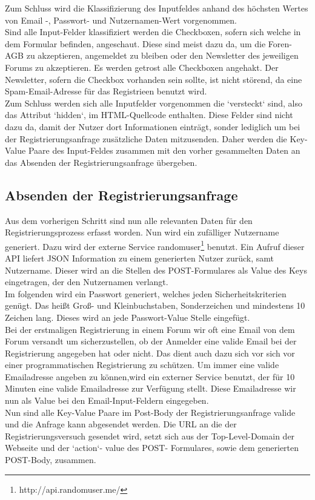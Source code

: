 Zum Schluss wird die Klassifizierung des Inputfeldes anhand des höchsten Wertes von Email -, Passwort- und Nutzernamen-Wert vorgenommen. \\
Sind alle Input-Felder klassifiziert werden die Checkboxen, sofern sich welche in dem Formular befinden, angeschaut. Diese sind meist dazu da, um die Foren-AGB zu akzeptieren, angemeldet zu bleiben oder den Newsletter des jeweiligen Forums zu akzeptieren.
Es werden getrost alle Checkboxen angehakt. Der Newsletter, sofern die Checkbox vorhanden sein sollte, ist nicht störend, da eine Spam-Email-Adresse für das Registrieen benutzt wird.\\
Zum Schluss werden sich alle Inputfelder vorgenommen die `versteckt` sind, also das Attribut `hidden`, im HTML-Quellcode enthalten.
Diese Felder sind nicht dazu da, damit der Nutzer dort Informationen einträgt, sonder lediglich um bei der Registrierungsanfrage zusätzliche Daten mitzusenden. Daher werden die Key-Value Paare des Input-Feldes zusammen mit den vorher gesammelten Daten an das Absenden der Registrierungsanfrage übergeben.
\subsection{Absenden der Registrierungsanfrage}
Aus dem vorherigen Schritt sind nun alle relevanten Daten für den Registrierungsprozess erfasst worden. Nun wird ein zufälliger Nutzername generiert. Dazu wird der externe Service randomuser\footnote{http://api.randomuser.me/} benutzt. Ein Aufruf dieser API liefert JSON Information zu einem generierten Nutzer zurück, samt Nutzername. Dieser wird an die Stellen des POST-Formulares als Value des Keys eingetragen, der den Nutzernamen verlangt.\\
Im folgenden wird ein Passwort generiert, welches jeden Sicherheitskriterien genügt. Das heißt Groß- und Kleinbuchstaben, Sonderzeichen und mindestens 10 Zeichen lang. Dieses wird an jede Passwort-Value Stelle eingefügt.\\
Bei der erstmaligen Registrierung in einem Forum wir oft eine Email von dem Forum versandt um sicherzustellen, ob der Anmelder eine valide Email bei der Registrierung angegeben hat oder nicht. Das dient auch dazu sich vor sich vor einer programmatischen Registrierung zu schützen. Um immer eine valide Emailadresse angeben zu können,wird ein externer Service benutzt, der für 10 Minuten eine valide Emailadresse zur Verfügung stellt. Diese Emailadresse wir nun als Value bei den Email-Input-Feldern eingegeben.\\
Nun sind alle Key-Value Paare im Post-Body der Registrierungsanfrage valide und die Anfrage kann abgesendet werden.
Die URL an die der Registrierungsversuch gesendet wird, setzt sich aus der Top-Level-Domain der Webseite und der `action`- value des POST- Formulares, sowie dem generierten POST-Body, zusammen.
